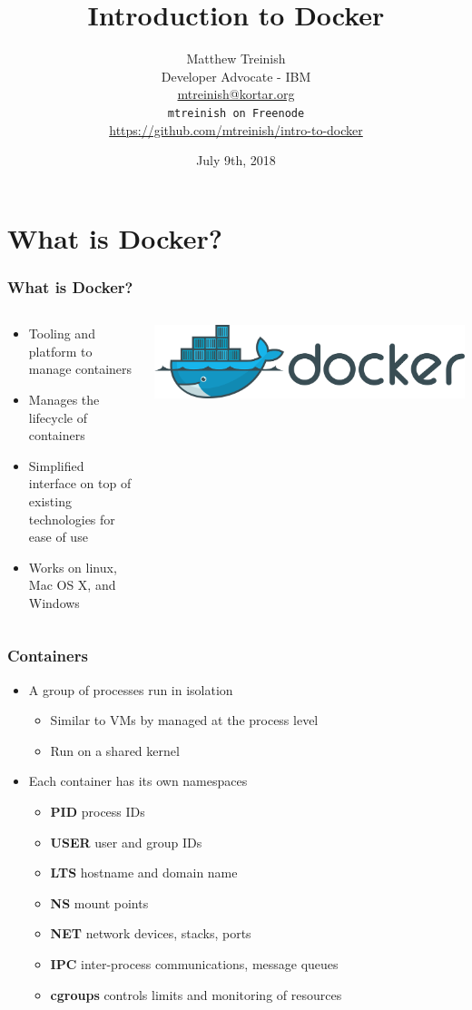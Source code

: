 \documentclass[aspectratio=169,11pt,hyperref={colorlinks=true}]{beamer}
\author[Matthew Treinish]{%
    \texorpdfstring{%
        \centering
        Matthew Treinish\\
        Developer Advocate - IBM \\
        \href{mailto:mtreinish@kortar.org}{mtreinish@kortar.org}\\
        \texttt{mtreinish on Freenode}\\
        \href{https://github.com/mtreinish/intro-to-docker}{https://github.com/mtreinish/intro-to-docker}
   }
   {Matthew Treinish}
}
\date{July 9th, 2018}
\title{Introduction to Docker}
\begin{document}
\titlepage

\section{What is Docker?}
\begin{frame}
    \frametitle{What is Docker?}
    \begin{columns}[T]
        \begin{column}{.48\textwidth}
            \begin{itemize}
                \item Tooling and platform to manage containers
                \item Manages the lifecycle of containers
                \item Simplified interface on top of existing technologies for ease of use
                \item Works on linux, Mac OS X, and Windows
            \end{itemize}
        \end{column}
        \begin{column}{.48\textwidth}
            \includegraphics[width=.9\textwidth]{Docker_logo.png}
        \end{column} 
    \end{columns}
\end{frame}

\begin{frame}
    \frametitle{Containers}
    \begin{itemize}
    \item A group of processes run in isolation
        \begin{itemize}
            \item Similar to VMs by managed at the process level
            \item Run on a shared kernel
        \end{itemize}
    \item Each container has its own namespaces
        \begin{itemize}
            \item \textbf{PID} process IDs
            \item \textbf{USER} user and group IDs
            \item \textbf{LTS} hostname and domain name
            \item \textbf{NS} mount points
            \item \textbf{NET} network devices, stacks, ports
            \item \textbf{IPC} inter-process communications, message queues
            \item \textbf{cgroups} controls limits and monitoring of resources
        \end{itemize}
    \end{itemize}
\end{frame}
\end{document}
